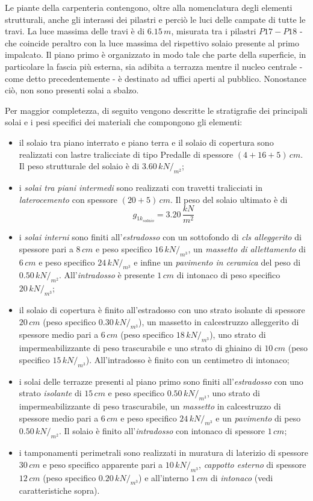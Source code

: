 Le piante della carpenteria contengono, oltre alla nomenclatura degli elementi strutturali, anche gli interassi dei pilastri e perciò le luci delle campate di tutte le travi. La luce massima delle travi è di $6.15\,m$, misurata tra i pilastri $P17 - P18$ - che coincide peraltro con la luce massima del rispettivo solaio presente al primo impalcato. 
Il piano primo è organizzato in modo tale che parte della superficie, in particolare la fascia più esterna, sia adibita a terrazza mentre il nucleo centrale - come detto precedentemente - è destinato ad uffici aperti al pubblico. Nonostance ciò, non sono presenti solai a sbalzo.

Per maggior completezza, di seguito vengono descritte le stratigrafie dei principali solai e i pesi specifici dei materiali che compongono gli elementi: 
\begin{itemize}
 \item il solaio tra piano interrato e piano terra e il solaio di copertura sono realizzati con lastre tralicciate di tipo Predalle di spessore $(4+16+5)\,\si{cm}$. Il peso strutturale del solaio è di $3.60\,\si{kN}/_{\si{m^2}}$;
 \item i \emph{solai tra piani intermedi} sono realizzati con travetti tralicciati in \emph{laterocemento} con spessore $(20+5)\,\si{cm}$. Il peso del solaio ultimato è di
 \begin{equation*}
  g_{1k_{solaio}} = 3.20\,\dfrac{kN}{m^2}
 \end{equation*}
 \item i \emph{solai interni} sono finiti all'\emph{estradosso} con un sottofondo di \emph{cls alleggerito} di spessore pari a $8\,\si{cm}$ e peso specifico $16\,kN/_{m^3}$, un \emph{massetto di allettamento} di $6\,\si{cm}$ e peso specifico $24\,kN/_{m^3}$ e infine un \emph{pavimento in ceramica} del peso di $0.50\,kN/_{m^2}$. All'\emph{intradosso} è presente $1\,\si{cm}$ di intonaco di peso specifico $20\,kN/_{m^3}$;
 \item il solaio di copertura è finito all'estradosso con uno strato isolante di spessore $20\,cm$ (peso specifico $0.30\,kN/_{m^3}$), un massetto in calcestruzzo alleggerito di spessore medio pari a $6\,cm$ (peso specifico $18\,kN/_{m^3}$), uno strato di impermeabilizzante di peso trascurabile e uno strato di ghiaino di $10\,cm$ (peso specifico $15\,kN/_{m^3}$). All'intradosso è finito con un centimetro di intonaco;
 \item i solai delle terrazze presenti al piano primo sono finiti all'\emph{estradosso} con uno strato \emph{isolante} di $15\,\si{cm}$ e peso specifico $0.50\,kN/_{m^3}$, uno strato di impermeabilizzante di peso trascurabile, un \emph{massetto} in calcestruzzo di spessore medio pari a $6\,\si{cm}$ e peso specifico $24\,kN/_{m^3}$ e un \emph{pavimento} di peso $0.50\,kN/_{m^2}$. Il solaio è finito all'\emph{intradosso} con intonaco di spessore $1\,\si{cm}$;
 \item i tamponamenti perimetrali sono realizzati in muratura di laterizio di spessore $30\,\si{cm}$ e peso specifico apparente pari a $10\,kN/_{m^3}$, \emph{cappotto esterno} di spessore $12\,\si{cm}$ (peso specifico $0.20\,kN/_{m^3}$) e all'interno $1\,\si{cm}$ di \emph{intonaco} (vedi caratteristiche sopra).
\end{itemize}


